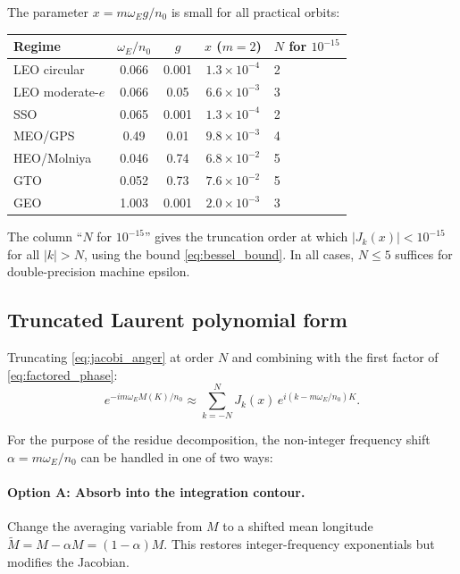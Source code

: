 \documentclass[11pt]{article}
\begin{document}
The parameter $x = m\omega_E g / n_0$ is small for all practical orbits:
\begin{center}
\begin{tabular}{lcccl}
\toprule
Regime & $\omega_E / n_0$ & $g$ & $x$ ($m=2$) & $N$ for $10^{-15}$ \\
\midrule
LEO circular   & 0.066 & 0.001 & $1.3 \times 10^{-4}$ & 2 \\
LEO moderate-$e$& 0.066 & 0.05  & $6.6 \times 10^{-3}$ & 3 \\
SSO            & 0.065 & 0.001 & $1.3 \times 10^{-4}$ & 2 \\
MEO/GPS        & 0.49  & 0.01  & $9.8 \times 10^{-3}$ & 4 \\
HEO/Molniya   & 0.046 & 0.74  & $6.8 \times 10^{-2}$ & 5 \\
GTO            & 0.052 & 0.73  & $7.6 \times 10^{-2}$ & 5 \\
GEO            & 1.003 & 0.001 & $2.0 \times 10^{-3}$ & 3 \\
\bottomrule
\end{tabular}
\end{center}

The column ``$N$ for $10^{-15}$'' gives the truncation order at which
$|J_k(x)| < 10^{-15}$ for all $|k| > N$, using the bound
\eqref{eq:bessel_bound}. In all cases, $N \le 5$ suffices for
double-precision machine epsilon.

\subsection{Truncated Laurent polynomial form}

Truncating \eqref{eq:jacobi_anger} at order $N$ and combining with the
first factor of \eqref{eq:factored_phase}:
\begin{equation}
e^{-im\omega_E M(K)/n_0}
\approx \sum_{k=-N}^{N} J_k(x)\,
e^{i(k - m\omega_E/n_0)K}.
\label{eq:truncated_phase}
\end{equation}

For the purpose of the residue decomposition, the non-integer frequency
shift $\alpha = m\omega_E / n_0$ can be handled in one of two ways:

\paragraph{Option A: Absorb into the integration contour.}
Change the averaging variable from $M$ to a shifted mean longitude
$\tilde M = M - \alpha M = (1 - \alpha)M$. This restores integer-frequency
exponentials but modifies the Jacobian.
\end{document}
